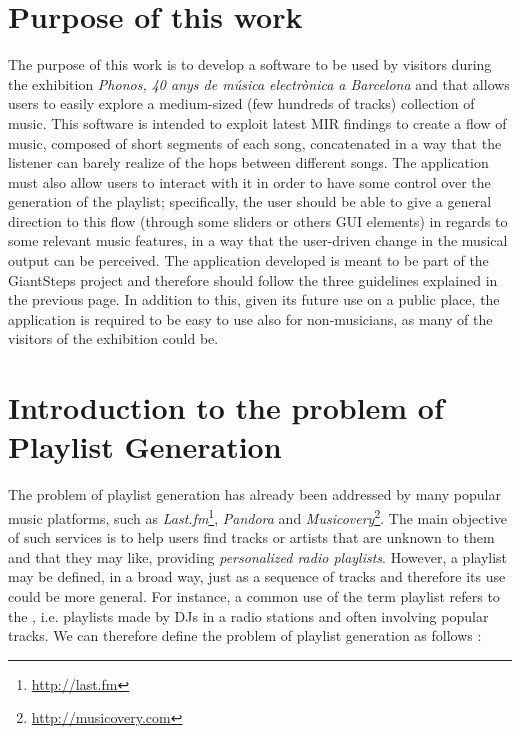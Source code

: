 
\section{Purpose of this work}
The purpose of this work is to develop a software to be used by visitors during the exhibition \textit{Phonos, 40 anys de música electrònica a Barcelona} and that allows users to easily explore a medium-sized (few hundreds of tracks) collection of music. This software is intended to exploit latest MIR findings to create a flow of music, composed of short segments of each song, concatenated in a way that the listener can barely realize of the hops between different songs. The application must also allow users to interact with it in order to have some control over the generation of the playlist; specifically, the user should be able to give a general direction to this flow (through some sliders or others GUI elements) in regards to some relevant music features, in a way that the user-driven change in the musical output can be perceived. The application developed is meant to be part of the GiantSteps project and therefore should follow the three guidelines explained in the previous page. In addition to this, given its future use on a public place, the application is required to be easy to use also for non-musicians, as many of the visitors of the exhibition could be.

\section{Introduction to the problem of Playlist Generation}
The problem of playlist generation has already been addressed by many popular music platforms, such as \textit{Last.fm}\footnote{\url{http://last.fm}}, \textit{Pandora} and \textit{Musicovery}\footnote{\url{http://musicovery.com}}. The main objective of such services is to help users find tracks or artists that are unknown to them and that they may like, providing \textit{personalized radio playlists}. However, a playlist may be defined, in a broad way, just as a sequence of tracks \cite{bonnin14} and therefore its use could be more general. For instance, a common use of the term playlist refers to the , i.e. playlists made by DJs in a radio stations and often involving popular tracks. We can therefore define the problem of playlist generation as follows \cite{bonnin14}:

